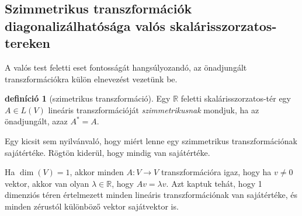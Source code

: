 \documentclass[9pt, a4paper, showtrims]{memoir}
\theoremstyle{plain}
\theoremstyle{remark}
\theoremstyle{definition}
\newtheorem{definition}[proposition]{definíció}
\begin{document}
\subsection{Szimmetrikus transzformációk diagonalizálhatósága valós skalárisszorzatos-tereken}
A valós test feletti eset fontosságát hangsúlyozandó,
az önadjungált transzformációkra külön elnevezést vezetünk be.
\begin{definition}[szimetrikus transzformáció]
	Egy $\mathbb{R}$ feletti skalárisszorzatos-tér egy $A\in L\left( V \right)$ lineáris transzformációját
	\emph{szimmetrikusnak} mondjuk, ha az önadjungált, azaz  $A^\ast=A$.
\end{definition}
Egy kicsit sem nyilvánvaló, hogy miért lenne egy szimmetrikus transzformációnak sajátértéke.
Rögtön kiderül, hogy mindig van sajátértéke.

Ha $\dim(V)=1$, akkor minden $A:V\to V$ transzformációra igaz, hogy ha $v\neq 0$ vektor, 
akkor van olyan $\lambda\in\mathbb{R}$,
hogy $Av=\lambda v$. 
Azt kaptuk tehát, hogy 1 dimenziós téren értelmezett minden lineáris transzformációnak
van sajátértéke, és minden zérustól különböző vektor sajátvektor is.
\end{document}
